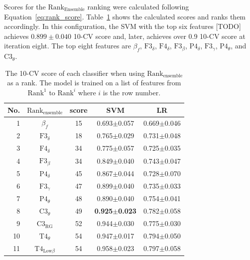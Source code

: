 \documentclass[pdflatex,sn-mathphys]{sn-jnl}%
\theoremstyle{thmstyleone}%
\theoremstyle{thmstyletwo}%
\theoremstyle{thmstylethree}%
\begin{document}
Scores for the $\text{Rank}_{\text{Ensemble}}$ ranking were calculated following Equation~\ref{eq:rank_score}. Table~\ref{tab:cv_ensemble} shows the calculated scores and ranks them accordingly. In this configuration, the SVM with the top six features [TODO] achieves $0.899\pm0.040$ 10-CV score and, later, achieves over 0.9 10-CV score at iteration eight. The top eight features are $\beta_{f}$, $\text{F3}_{\delta}$, $\text{F4}_{\delta}$, $\text{F3}_{\beta}$, $\text{P4}_{\delta}$, $\text{F3}_{\gamma}$, $\text{P4}_{\theta}$, and $\text{C3}_{\theta}$.

\begin{table}[h!]
\centering
\caption{The 10-CV score of each classifier when using $\text{Rank}_{\text{ensemble}}$ as a rank. The model is trained on a list of features from $\text{Rank}^1$ to $\text{Rank}^i$ where $i$ is the row number.}
\label{tab:cv_ensemble}
\begin{tabular}{r|cccc}
\hline
 No. & $\text{Rank}_{\text{ensemble}}$ &  score &                      SVM &                       LR \\
\hline
   1 &                     $\beta_{f}$ &     15 &          0.693$\pm$0.057 &          0.669$\pm$0.046 \\
   2 &            $\text{F3}_{\delta}$ &     18 &          0.765$\pm$0.029 &          0.731$\pm$0.048 \\
   3 &            $\text{F4}_{\delta}$ &     34 &          0.775$\pm$0.057 &          0.725$\pm$0.035 \\
   4 &             $\text{F3}_{\beta}$ &     34 &          0.849$\pm$0.040 &          0.743$\pm$0.047 \\
   5 &            $\text{P4}_{\delta}$ &     45 &          0.867$\pm$0.044 &          0.728$\pm$0.070 \\
   6 &            $\text{F3}_{\gamma}$ &     47 &          0.899$\pm$0.040 &          0.735$\pm$0.033 \\
   7 &            $\text{P4}_{\theta}$ &     48 &          0.890$\pm$0.040 &          0.754$\pm$0.041 \\
   8 &            $\text{C3}_{\theta}$ &     49 & \textbf{0.925$\pm$0.023} &          0.782$\pm$0.058 \\
   9 &         $\text{C3}_{\text{RG}}$ &     52 &          0.944$\pm$0.030 &          0.775$\pm$0.030 \\
  10 &            $\text{T4}_{\theta}$ &     54 &          0.947$\pm$0.017 &          0.794$\pm$0.050 \\
  11 &   $\text{T4}_{\text{Low}\beta}$ &     54 &          0.958$\pm$0.023 &          0.797$\pm$0.058 \\

\end{tabular}
\end{table}
\end{document}
